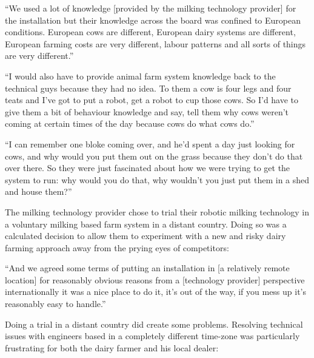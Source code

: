\begin{displayquote}[Participant 1/2]
\small
\enquote{We used a lot of knowledge [provided by the milking technology provider] for the installation but their knowledge across the board was confined to European conditions. European cows are different, European dairy systems are different, European farming costs are very different, labour patterns and all sorts of things are very different.} 
\end{displayquote}


\begin{displayquote}[Participant 9/2]
\small
\enquote{I would also have to provide animal farm system knowledge back to the technical guys because they had no idea. To them a cow is four legs and four teats and I've got to put a robot, get a robot to cup those cows.  So I'd have to give them a bit of behaviour knowledge and say, tell them why cows weren't coming at certain times of the day because cows do what cows do.} 
\end{displayquote}


\begin{displayquote}[Participant 15/2]
\small
\enquote{I can remember one bloke coming over, and he'd spent a day just looking for cows, and why would you put them out on the grass because they don't do that over there. So they were just fascinated about how we were trying to get the system to run: why would you do that, why wouldn't you just put them in a shed and house them?} 
\end{displayquote}


The milking technology provider chose to trial their robotic milking technology in a voluntary milking based farm system in a distant country. Doing so was a calculated decision to allow them to experiment with a new and risky dairy farming approach away from the prying eyes of competitors:

\begin{displayquote}[Participant 18/2]
\small
\enquote{And we agreed some terms of putting an installation in [a relatively remote location] for reasonably obvious reasons from a [technology provider] perspective internationally it was a nice place to do it, it's out of the way, if you mess up it's reasonably easy to handle.} 
\end{displayquote}


Doing a trial in a distant country did create some problems. Resolving technical issues with engineers based in a completely different time-zone was particularly frustrating for both the dairy farmer and his local dealer:

